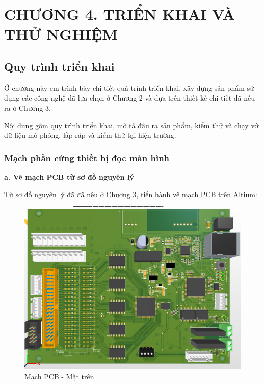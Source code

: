 \section*{CHƯƠNG 4. TRIỂN KHAI VÀ THỬ NGHIỆM}
\setcounter{section}{4}
    \setcounter{subsection}{0}
        \setcounter{figure}{0}
            \setcounter{table}{0}
                \setcounter{equation}{0}


\subsection{Quy trình triển khai}

\hspace{0.8cm} Ở chương này em trình bày chi tiết quá trình triển khai, xây dựng sản phẩm sử dụng các công nghệ đã lựa chọn ở Chương 2 và dựa trên thiết kế chi tiết đã nêu ra ở Chương 3.

Nội dung gồm quy trình triển khai, mô tả đầu ra sản phẩm,
kiểm thử và chạy với dữ liệu mô phỏng, lắp ráp và kiểm thử tại hiện trường.

\subsubsection{Mạch phần cứng thiết bị đọc màn hình}

\textbf{a. Vẽ mạch PCB từ sơ đồ nguyên lý}

Từ sơ đồ nguyên lý đã đã nêu ở Chương 3, tiến hành vẽ mạch PCB trên Altium:

\begin{figure}[!ht]
    \centering
    \includegraphics[width=0.8\linewidth]{Figures/PCB_top-down.png}
   
    \caption{Mạch PCB - Mặt trên}
    \label{fig:PCB_top-down}
\end{figure}

